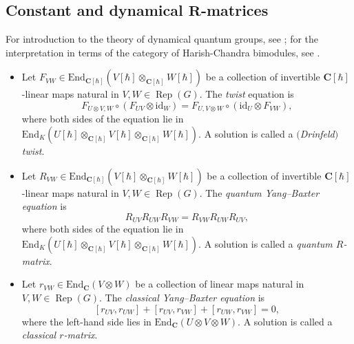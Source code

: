 \documentclass[11pt]{article}
\numberwithin{equation}{section}
\newcommand{\C}{\mathbf{C}}
\newcommand{\End}{\mathrm{End}}
\newcommand{\id}{\mathrm{id}}
\DeclareMathOperator{\Rep}{Rep}
\begin{document}
	\subsection[Constant and dynamical R-matrices]{Constant and dynamical $\boldsymbol{R}$-matrices}
	\label{subsect::dynamica_r_mat}
	For introduction to the theory of dynamical quantum groups, see \cite{EtingofSchiffmann}; for the interpretation in terms of the category of Harish-Chandra bimodules, see \cite{KalmykovSafronov}.
	
	\begin{Definition}
		\label{def::all_constant}\qquad
		\begin{itemize}\itemsep=0pt
			\item Let $F_{VW} \in \End_{\C[\hbar]}(V[\hbar]\otimes_{\C[\hbar]} W[\hbar]) $ be a collection of invertible $\C[\hbar]$-linear maps natural in $V,W\in \Rep(G)$. The \emph{twist} equation is
			\begin{equation}
				\label{eq::twist}
				F_{U \otimes V,W} \circ (F_{UV} \otimes \id_W) = F_{U,V\otimes W} \circ (\id_U \otimes F_{VW}),
			\end{equation}
			where both sides of the equation lie in $\End_K(U[\hbar] \otimes_{\C[\hbar]} V[\hbar] \otimes_{\C[\hbar]} W[\hbar])$. A solution is called a \emph{$($Drinfeld$)$ twist}.
			\item Let $R_{VW}\in \End_{\C[\hbar]}(V[\hbar]\otimes_{\C[\hbar]} W[\hbar]) $ be a collection of invertible $\C[\hbar]$-linear maps natural in $V,W\in \Rep(G)$. The \emph{quantum Yang--Baxter equation} is
			\begin{equation}
				\label{eq::qybe}
				R_{UV} R_{UW} R_{VW} = R_{VW} R_{UW} R_{UV},
			\end{equation}
			where both sides of the equation lie in $\End_K(U[\hbar] \otimes_{\C[\hbar]} V[\hbar] \otimes_{\C[\hbar]} W[\hbar])$. A solution is called a \emph{quantum $R$-matrix}.
			\item Let $r_{VW}\in \End_{\C}(V\otimes W) $ be a collection of linear maps natural in $V,W\in \Rep(G)$. The \emph{classical Yang--Baxter equation} is
			\begin{equation}
				\label{eq::cybe}
				[r_{UV},r_{UW}] + [r_{UV},r_{VW}] + [r_{UW}, r_{VW}] = 0,
			\end{equation}
			where the left-hand side lies in $\End_{\C}(U \otimes V \otimes W)$. A solution is called a \emph{classical $r$-matrix}.
		\end{itemize}
	\end{Definition}
	
\end{document}
